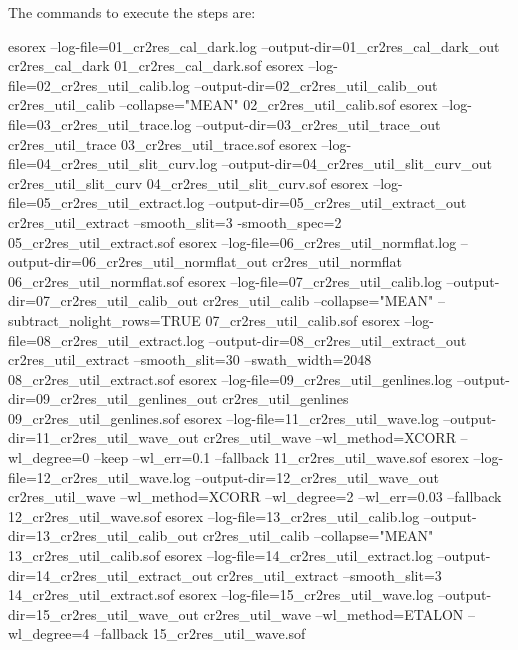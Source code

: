 The commands to execute the steps are:
\begin{shell}[fontsize=\footnotesize]
esorex --log-file=01_cr2res_cal_dark.log --output-dir=01_cr2res_cal_dark_out cr2res_cal_dark 
  01_cr2res_cal_dark.sof
esorex --log-file=02_cr2res_util_calib.log --output-dir=02_cr2res_util_calib_out 
  cr2res_util_calib --collapse="MEAN" 02_cr2res_util_calib.sof
esorex --log-file=03_cr2res_util_trace.log --output-dir=03_cr2res_util_trace_out    
  cr2res_util_trace 03_cr2res_util_trace.sof
esorex --log-file=04_cr2res_util_slit_curv.log --output-dir=04_cr2res_util_slit_curv_out
  cr2res_util_slit_curv 04_cr2res_util_slit_curv.sof
esorex --log-file=05_cr2res_util_extract.log --output-dir=05_cr2res_util_extract_out
  cr2res_util_extract --smooth_slit=3 -smooth_spec=2 
  05_cr2res_util_extract.sof
esorex --log-file=06_cr2res_util_normflat.log --output-dir=06_cr2res_util_normflat_out 
  cr2res_util_normflat 06_cr2res_util_normflat.sof
esorex --log-file=07_cr2res_util_calib.log --output-dir=07_cr2res_util_calib_out 
  cr2res_util_calib --collapse="MEAN" --subtract_nolight_rows=TRUE 07_cr2res_util_calib.sof
esorex --log-file=08_cr2res_util_extract.log --output-dir=08_cr2res_util_extract_out  
  cr2res_util_extract --smooth_slit=30 --swath\_width=2048  08_cr2res_util_extract.sof
esorex --log-file=09_cr2res_util_genlines.log  --output-dir=09_cr2res_util_genlines_out  
  cr2res_util_genlines 09_cr2res_util_genlines.sof
esorex --log-file=11_cr2res_util_wave.log --output-dir=11_cr2res_util_wave_out 
  cr2res_util_wave --wl_method=XCORR --wl_degree=0 --keep --wl_err=0.1 --fallback 
11_cr2res_util_wave.sof
esorex --log-file=12_cr2res_util_wave.log --output-dir=12_cr2res_util_wave_out 
  cr2res_util_wave --wl_method=XCORR --wl_degree=2 --wl_err=0.03 --fallback 
  12_cr2res_util_wave.sof
esorex --log-file=13_cr2res_util_calib.log --output-dir=13_cr2res_util_calib_out 
  cr2res_util_calib --collapse="MEAN" 13_cr2res_util_calib.sof
esorex --log-file=14_cr2res_util_extract.log --output-dir=14_cr2res_util_extract_out 
  cr2res_util_extract --smooth_slit=3 14_cr2res_util_extract.sof
esorex --log-file=15_cr2res_util_wave.log --output-dir=15_cr2res_util_wave_out 
  cr2res_util_wave --wl_method=ETALON --wl_degree=4 --fallback 15_cr2res_util_wave.sof
\end{shell}



